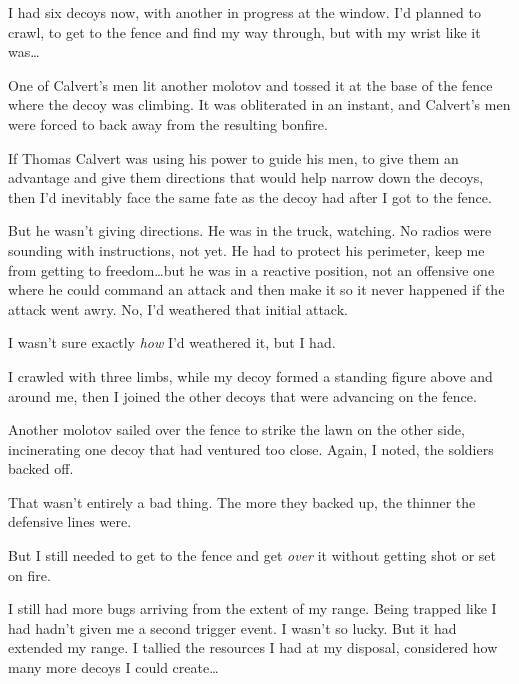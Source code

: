 I had six decoys now, with another in progress at the window.  I'd planned to crawl, to get to the fence and find my way through, but with my wrist like it was\ldots



One of Calvert's men lit another molotov and tossed it at the base of the fence where the decoy was climbing.  It was obliterated in an instant, and Calvert's men were forced to back away from the resulting bonfire.



If Thomas Calvert was using his power to guide his men, to give them an advantage and give them directions that would help narrow down the decoys, then I'd inevitably face the same fate as the decoy had after I got to the fence.



But he wasn't giving directions.  He was in the truck, watching.  No radios were sounding with instructions, not yet.  He had to protect his perimeter, keep me from getting to freedom\ldots but he was in a reactive position, not an offensive one where he could command an attack and then make it so it never happened if the attack went awry.  No, I'd weathered that initial attack.



I wasn't sure exactly \emph{how} I'd weathered it, but I had.



I crawled with three limbs, while my decoy formed a standing figure above and around me, then I joined the other decoys that were advancing on the fence.



Another molotov sailed over the fence to strike the lawn on the other side, incinerating one decoy that had ventured too close.  Again, I noted, the soldiers backed off.



That wasn't entirely a bad thing.  The more they backed up, the thinner the defensive lines were.



But I still needed to get to the fence and get \emph{over} it without getting shot or set on fire.



I still had more bugs arriving from the extent of my range.  Being trapped like I had hadn't given me a second trigger event.  I wasn't so lucky.  But it had extended my range.  I tallied the resources I had at my disposal, considered how many more decoys I could create\ldots



